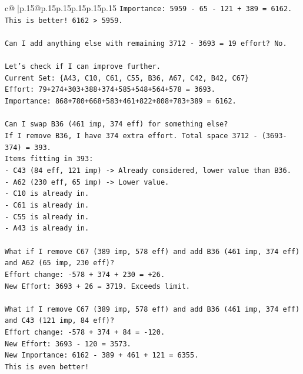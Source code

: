 \documentclass{article}
\begin{document}
{\begin{supertabular}{c@{$\;$}|p{.15\linewidth}@{}p{.15\linewidth}p{.15\linewidth}p{.15\linewidth}p{.15\linewidth}p{.15\linewidth}}
{{{\texttt{Importance: 5959 {-} 65 {-} 121 + 389 = 6162.} \\
\texttt{This is better! 6162 > 5959.} \\
\\ 
\texttt{Can I add anything else with remaining 3712 {-} 3693 = 19 effort? No.} \\
\\ 
\texttt{Let's check if I can improve further.} \\
\texttt{Current Set: \{A43, C10, C61, C55, B36, A67, C42, B42, C67\}} \\
\texttt{Effort: 79+274+303+388+374+585+548+564+578 = 3693.} \\
\texttt{Importance: 868+780+668+583+461+822+808+783+389 = 6162.} \\
\\ 
\texttt{Can I swap B36 (461 imp, 374 eff) for something else?} \\
\texttt{If I remove B36, I have 374 extra effort. Total space 3712 {-} (3693{-}374) = 393.} \\
\texttt{Items fitting in 393:} \\
\texttt{{-} C43 (84 eff, 121 imp) {-}> Already considered, lower value than B36.} \\
\texttt{{-} A62 (230 eff, 65 imp) {-}> Lower value.} \\
\texttt{{-} C10 is already in.} \\
\texttt{{-} C61 is already in.} \\
\texttt{{-} C55 is already in.} \\
\texttt{{-} A43 is already in.} \\
\\ 
\texttt{What if I remove C67 (389 imp, 578 eff) and add B36 (461 imp, 374 eff) and A62 (65 imp, 230 eff)?} \\
\texttt{Effort change: {-}578 + 374 + 230 = +26.} \\
\texttt{New Effort: 3693 + 26 = 3719. Exceeds limit.} \\
\\ 
\texttt{What if I remove C67 (389 imp, 578 eff) and add B36 (461 imp, 374 eff) and C43 (121 imp, 84 eff)?} \\
\texttt{Effort change: {-}578 + 374 + 84 = {-}120.} \\
\texttt{New Effort: 3693 {-} 120 = 3573.} \\
\texttt{New Importance: 6162 {-} 389 + 461 + 121 = 6355.} \\
\texttt{This is even better!} \\
}}}
\end{supertabular}}
\end{document}
